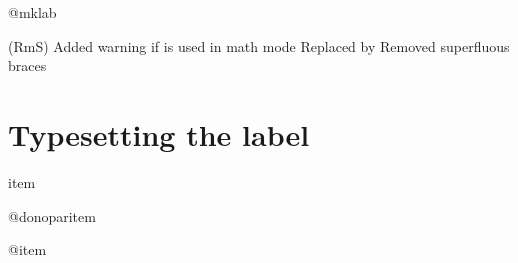 \begin{texcode}{}{}
 \begin{docCommand}{@mklab}{}
 \end{docCommand}
    \begin{teX}
\def\@mklab#1{\hfil #1}
    \end{teX}

     {(RmS) Added warning if  is used in math mode}
     {Replaced  by }
     {Removed superfluous braces}
     
\section{Typesetting the label}     
 
 \begin{docCommand}{item}{}
 
 \end{docCommand}     
 
 
     \begin{teX}
\def\item{%
  \@inmatherr\item
  \@ifnextchar [\@item{\@noitemargtrue \@item[\@itemlabel]}}
    \end{teX}
 
 \begin{docCommand} {@donoparitem} { }
 \end{docCommand}
    \begin{teX}
\def\@donoparitem{%
  \@noparitemfalse
  \global\setbox\@labels\hbox{\hskip -\leftmargin
                               \unhbox\@labels
                                \hskip \leftmargin}%
  \if@minipage
    \else
      \@tempskipa\lastskip
      \vskip -\lastskip
      \advance\@tempskipa\@outerparskip
      \advance\@tempskipa -\parskip
      \vskip\@tempskipa
  \fi}
    \end{teX}

 
 \begin{docCommand}{@item}{ }
 \end{docCommand}
 

\end{texcode}
